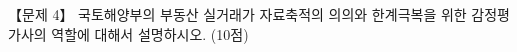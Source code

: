 \begin{longquestion}{【문제 4】}
국토해양부의 부동산 실거래가 자료축적의 의의와 한계극복을 위한 감정평가사의 역할에 대해서 설명하시오. (10점) \par
\end{longquestion}
